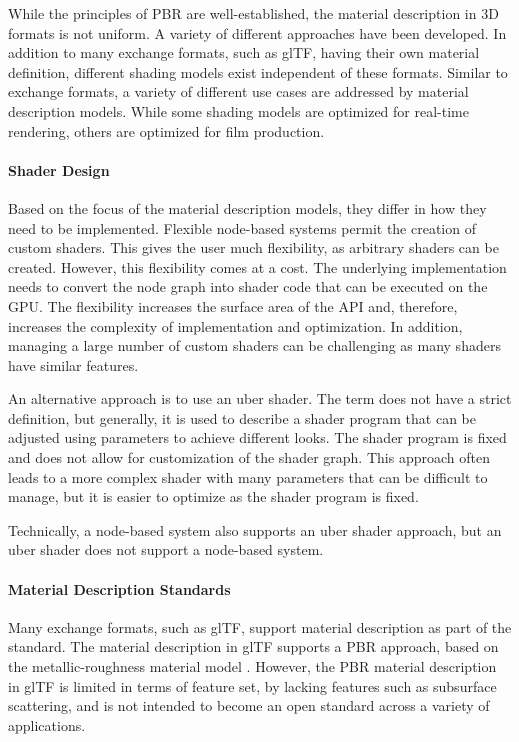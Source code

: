 While the principles of \gls{PBR} are well-established, the material description in 3D formats is not uniform. A variety of different approaches have been developed. In addition to many exchange formats, such as \gls{glTF}, having their own material definition, different shading models exist independent of these formats. Similar to exchange formats, a variety of different use cases are addressed by material description models. While some shading models are optimized for real-time rendering, others are optimized for film production.

\paragraph{Shader Design}

Based on the focus of the material description models, they differ in how they need to be implemented. Flexible node-based systems permit the creation of custom shaders. This gives the user much flexibility, as arbitrary shaders can be created. However, this flexibility comes at a cost. The underlying implementation needs to convert the node graph into shader code that can be executed on the \gls{GPU}. The flexibility increases the surface area of the \gls{API} and, therefore, increases the complexity of implementation and optimization. In addition, managing a large number of custom shaders can be challenging as many shaders have similar features.

An alternative approach is to use an \gls{uber shader}. The term does not have a strict definition, but generally, it is used to describe a shader program that can be adjusted using parameters to achieve different looks. The shader program is fixed and does not allow for customization of the shader graph. This approach often leads to a more complex shader with many parameters that can be difficult to manage, but it is easier to optimize as the shader program is fixed.

Technically, a node-based system also supports an \gls{uber shader} approach, but an \gls{uber shader} does not support a node-based system.

\paragraph{Material Description Standards}
\label{ch:materialDescriptionStandards}

Many exchange formats, such as \gls{glTF}, support material description as part of the standard. The material description in \gls{glTF} supports a \gls{PBR} approach, based on the metallic-roughness material model \cite{gltfSpecification}. However, the \gls{PBR} material description in \gls{glTF} is limited in terms of feature set, by lacking features such as subsurface scattering, and is not intended to become an open standard across a variety of applications.

